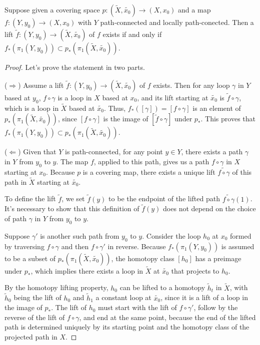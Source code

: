 \documentclass[12pt]{article}
\begin{document}
\begin{theorem}
	Suppose given a covering space \(p : (\tilde{X}, \tilde{x_0}) \rightarrow (X, x_0)\) and a map \(f : (Y, y_0) \rightarrow (X, x_0)\) with \(Y\) path-connected and locally path-conected. Then a lift \(\tilde{f} : (Y, y_0) \rightarrow (\tilde{X}, \tilde{x_0})\) of \(f\) exists if and only if \(f_* (\pi_1(Y, y_0)) \subset p_*(\pi_1(\tilde{X}, \tilde{x_0}))\).
	\label{theorem:criterion}
\end{theorem}

\begin{proof}
	Let's prove the statement in two parts.

	(\(\Rightarrow\)) Assume a lift \(\tilde{f} : (Y, y_0) \rightarrow (\tilde{X}, \tilde{x_0})\) of \(f\) exists. Then for any loop \(\gamma\) in \(Y\) based at \(y_0\), \(f \circ \gamma\) is a loop in \(X\) based at \(x_0\), and its lift starting at \(\tilde{x_0}\) is \(\tilde{f} \circ \gamma\), which is a loop in \(\tilde{X}\) based at \(\tilde{x_0}\). Thus, \(f_*([\gamma]) = [f \circ \gamma]\) is an element of \(p_*(\pi_1(\tilde{X}, \tilde{x_0}))\), since \([f \circ \gamma]\) is the image of \([\tilde{f} \circ \gamma]\) under \(p_*\). This proves that \(f_* (\pi_1(Y, y_0)) \subset p_*(\pi_1(\tilde{X}, \tilde{x_0}))\).

	(\(\Leftarrow\)) Given that \(Y\) is path-connected, for any point \(y \in Y\), there exists a path \(\gamma\) in \(Y\) from \(y_0\) to \(y\). The map \(f\), applied to this path, gives us a path \(f \circ \gamma\) in \(X\) starting at \(x_0\). Because \(p\) is a covering map, there exists a unique lift \(\tilde{f \circ \gamma}\) of this path in \(\tilde{X}\) starting at \(\tilde{x_0}\).
	
	To define the lift \(\tilde{f}\), we set \(\tilde{f}(y)\) to be the endpoint of the lifted path \(\tilde{f \circ \gamma}(1)\). It's necessary to show that this definition of \(\tilde{f}(y)\) does not depend on the choice of path \(\gamma\) in \(Y\) from \(y_0\) to \(y\). 
	
	Suppose \(\gamma'\) is another such path from \(y_0\) to \(y\). Consider the loop \(h_0\) at \(x_0\) formed by traversing \(f \circ \gamma\) and then \(f \circ \gamma'\) in reverse. Because \(f_* (\pi_1(Y, y_0))\) is assumed to be a subset of \(p_*(\pi_1(\tilde{X}, \tilde{x_0}))\), the homotopy class \([h_0]\) has a preimage under \(p_*\), which implies there exists a loop in \(\tilde{X}\) at \(\tilde{x_0}\) that projects to \(h_0\).
	
	By the homotopy lifting property, \(h_0\) can be lifted to a homotopy \(\tilde{h}_t\) in \(\tilde{X}\), with \(\tilde{h}_0\) being the lift of \(h_0\) and \(\tilde{h}_1\) a constant loop at \(\tilde{x_0}\), since it is a lift of a loop in the image of \(p_*\). The lift of \(h_0\) must start with the lift of \(f \circ \gamma'\), follow by the reverse of the lift of \(f \circ \gamma\), and end at the same point, because the end of the lifted path is determined uniquely by its starting point and the homotopy class of the projected path in \(X\).
	

\end{proof}
\end{document}
